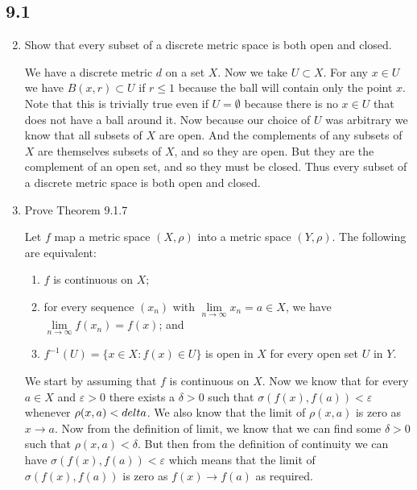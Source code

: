 \documentclass[letterpaper]{article}
\begin{document}
\renewcommand{\labelenumi}{\Alph{enumi}.}
\renewcommand{\labelenumii}{(\alph{enumii})}
\subsection*{9.1}
\begin{enumerate}
\setcounter{enumi}{1}
\item
Show that every subset of a discrete metric space is both open and closed.

We have a discrete metric $d$ on a set $X$. Now we take $U\subset X$. For any $x\in U$ we have $B(x,r)\subset U$ if $r\le 1$ because the ball will contain only the point $x$. Note that this is trivially true even if $U=\emptyset$ because there is no $x\in U$ that does not have a ball around it. Now because our choice of $U$ was arbitrary we know that all subsets of $X$ are open. And the complements of any subsets of $X$ are themselves subsets of $X$, and so they are open. But they are the complement of an open set, and so  they must be closed. Thus every subset of a discrete metric space is both open and closed.
\setcounter{enumi}{3}
\item
Prove Theorem 9.1.7

Let $f$ map a metric space $(X,\rho)$ into a metric space $(Y,\rho)$. The
following are equivalent:
\renewcommand{\labelenumii}{(\arabic{enumii})}
  \begin{enumerate}
    \item
    $f$ is continuous on $X$;

    \item
    for every sequence $(x_n)$ with $\lim\limits_{n\to\infty}x_n=a\in X$, we
    have $\lim\limits_{n\to\infty}f(x_n)=f(x)$; and
    \item
    $f^{-1}(U)=\{x\in X:f(x)\in U\}$ is open in $X$ for every open set $U$ in $Y$.
  \end{enumerate}

  We start by assuming that $f$ is continuous on $X$. Now we know that for every $a\in X$ and $\varepsilon>0$ there exists a $\delta>0$ such that $\sigma(f(x),f(a))<\varepsilon$ whenever $\rho(x,a)<\\delta$. We also know that the limit of $\rho(x,a)$ is zero as $x\to a$. Now from the definition of limit, we know that we can find some $\delta>0$ such that $\rho(x,a)<\delta$. But then from the definition of continuity we can have $\sigma(f(x),f(a))<\varepsilon$ which means that the limit of $\sigma(f(x),f(a))$ is zero as $f(x)\to f(a)$ as required.


\end{enumerate}
\end{document}
